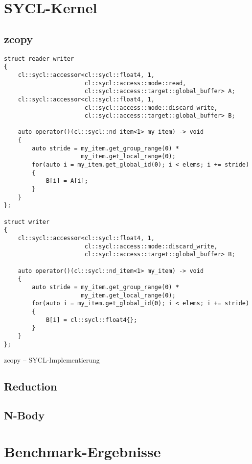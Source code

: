 \section{SYCL-Kernel}

\subsection{zcopy}

\begin{code}
    \begin{verbatim}
struct reader_writer
{
    cl::sycl::accessor<cl::sycl::float4, 1,
                       cl::sycl::access::mode::read,
                       cl::sycl::access::target::global_buffer> A;
    cl::sycl::accessor<cl::sycl::float4, 1,
                       cl::sycl::access::mode::discard_write,
                       cl::sycl::access::target::global_buffer> B;

    auto operator()(cl::sycl::nd_item<1> my_item) -> void
    {
        auto stride = my_item.get_group_range(0) *
                      my_item.get_local_range(0);
        for(auto i = my_item.get_global_id(0); i < elems; i += stride)
        {
            B[i] = A[i];
        }
    }
};

struct writer
{
    cl::sycl::accessor<cl::sycl::float4, 1,
                       cl::sycl::access::mode::discard_write,
                       cl::sycl::access::target::global_buffer> B;

    auto operator()(cl::sycl::nd_item<1> my_item) -> void
    {
        auto stride = my_item.get_group_range(0) *
                      my_item.get_local_range(0);
        for(auto i = my_item.get_global_id(0); i < elems; i += stride)
        {
            B[i] = cl::sycl::float4{};
        }
    }
};
    \end{verbatim}
    \caption{zcopy -- SYCL-Implementierung}
    \label{anhang:sycl:zcopy}
\end{code}

\subsection{Reduction}
\label{anhang:sycl:reduction}

\subsection{N-Body}

\section{Benchmark-Ergebnisse}

